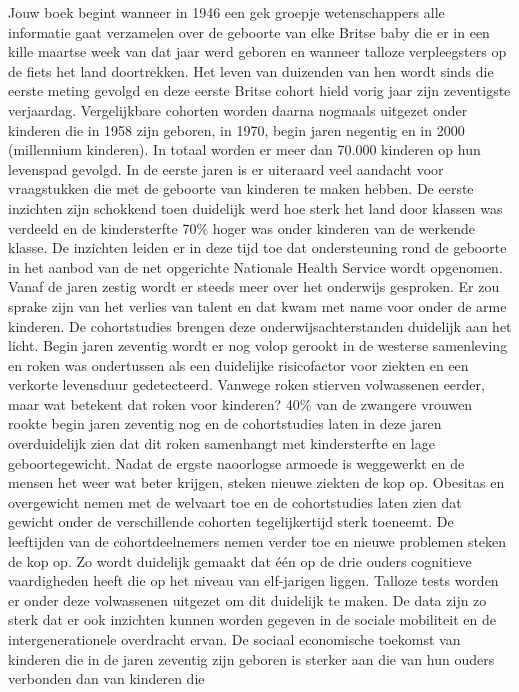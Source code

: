 \documentclass[]{book}
\begin{document}
Jouw boek begint wanneer in 1946 een gek groepje wetenschappers alle
informatie gaat verzamelen over de geboorte van elke Britse baby die er
in een kille maartse week van dat jaar werd geboren en wanneer talloze
verpleegsters op de fiets het land doortrekken. Het leven van duizenden
van hen wordt sinds die eerste meting gevolgd en deze eerste Britse
cohort hield vorig jaar zijn zeventigste verjaardag. Vergelijkbare
cohorten worden daarna nogmaals uitgezet onder kinderen die in 1958 zijn
geboren, in 1970, begin jaren negentig en in 2000 (millennium kinderen).
In totaal worden er meer dan 70.000 kinderen op hun levenspad gevolgd.
In de eerste jaren is er uiteraard veel aandacht voor vraagstukken die
met de geboorte van kinderen te maken hebben. De eerste inzichten zijn
schokkend toen duidelijk werd hoe sterk het land door klassen was
verdeeld en de kindersterfte 70\% hoger was onder kinderen van de
werkende klasse. De inzichten leiden er in deze tijd toe dat
ondersteuning rond de geboorte in het aanbod van de net opgerichte
Nationale Health Service wordt opgenomen. Vanaf de jaren zestig wordt er
steeds meer over het onderwijs gesproken. Er zou sprake zijn van het
verlies van talent en dat kwam met name voor onder de arme kinderen. De
cohortstudies brengen deze onderwijsachterstanden duidelijk aan het
licht. Begin jaren zeventig wordt er nog volop gerookt in de westerse
samenleving en roken was ondertussen als een duidelijke risicofactor
voor ziekten en een verkorte levensduur gedetecteerd. Vanwege roken
stierven volwassenen eerder, maar wat betekent dat roken voor kinderen?
40\% van de zwangere vrouwen rookte begin jaren zeventig nog en de
cohortstudies laten in deze jaren overduidelijk zien dat dit roken
samenhangt met kindersterfte en lage geboortegewicht. Nadat de ergste
naoorlogse armoede is weggewerkt en de mensen het weer wat beter
krijgen, steken nieuwe ziekten de kop op. Obesitas en overgewicht nemen
met de welvaart toe en de cohortstudies laten zien dat gewicht onder de
verschillende cohorten tegelijkertijd sterk toeneemt. De leeftijden van
de cohortdeelnemers nemen verder toe en nieuwe problemen steken de kop
op. Zo wordt duidelijk gemaakt dat één op de drie ouders cognitieve
vaardigheden heeft die op het niveau van elf-jarigen liggen. Talloze
tests worden er onder deze volwassenen uitgezet om dit duidelijk te
maken. De data zijn zo sterk dat er ook inzichten kunnen worden gegeven
in de sociale mobiliteit en de intergenerationele overdracht ervan. De
sociaal economische toekomst van kinderen die in de jaren zeventig zijn
geboren is sterker aan die van hun ouders verbonden dan van kinderen die
\end{document}
